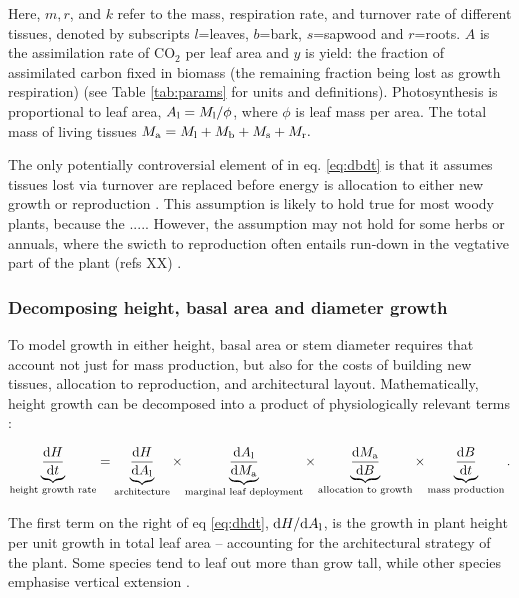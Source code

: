 \documentclass[a4paper,11pt]{article}
\begin{document}
Here, $m,r$, and $k$ refer to the mass, respiration rate, and
turnover rate of different tissues, denoted by subscripts $l$=leaves,
$b$=bark, $s$=sapwood and $r$=roots. $A$ is the assimilation
rate of CO$_2$ per leaf area and $y$ is yield: the fraction of
assimilated carbon fixed in biomass (the remaining fraction being lost
as growth respiration) (see Table \ref{tab:params} for units and
definitions). Photosynthesis is proportional to leaf area,
$A_{\rm l} = M_{\rm l} / \phi$, where $\phi$ is leaf mass per area.
The total mass of living tissues $M_{\rm a}=M_{\rm l}+M_{\rm b}+M_\textrm{s}+M_{\rm r}.$

The only potentially controversial element of in eq. \ref{eq:dbdt} is that it assumes tissues lost via turnover are replaced before energy is allocation to either new growth or reproduction \citep{Thornley-2000}. This assumption is likely to hold true for most woody plants, because the ..... However, the assumption may not hold for some herbs or annuals, where the swicth to reproduction often entails run-down in the vegtative part of the plant (refs XX) \citep{ Thornley-2000}.

\subsubsection{Decomposing height, basal area and diameter growth}

To model growth in either height, basal area or stem diameter requires that account not just for mass production, but also for the costs of building new tissues, allocation to reproduction, and architectural layout. Mathematically, height growth can be decomposed into a product of physiologically relevant terms \citep{Falster-2011}:

\begin{equation} \label{eq:dhdt}
\underbrace{\strut\frac{{\rm d}H}{{\rm d}t}}_\textrm{height growth rate}= \underbrace{\strut\frac{{\rm d}H}{{\rm d}A_{\rm l}}}_\textrm{architecture}
\times \underbrace{\strut\frac{{\rm d}A_{\rm l}}{{\rm d}M_{\rm a}}}_\textrm{marginal leaf deployment}
\times \underbrace{\strut\frac{{\rm d}M_{\rm a}}{{\rm d}B}}_\textrm{allocation to growth}
\times \underbrace{\strut\frac{{\rm d}B}{{\rm d}t}}_\textrm{mass production}.
\end{equation}

The first term on the right of eq \ref{eq:dhdt},
${\rm d}H / {\rm d}A_{\rm l}$, is the growth in plant height
per unit growth in total leaf area -- accounting for the architectural
strategy of the plant. Some species tend to leaf out more than grow
tall, while other species emphasise vertical
extension \citep{Poorter-2006}.
\end{document}
